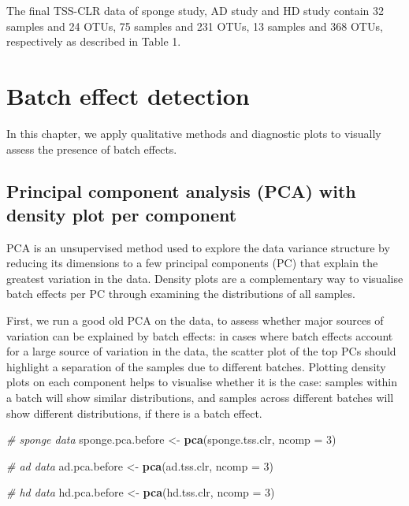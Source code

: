 \documentclass[]{book}
\newenvironment{Shaded}{\begin{snugshade}}{\end{snugshade}}
\newcommand{\KeywordTok}[1]{\textcolor[rgb]{0.13,0.29,0.53}{\textbf{#1}}}
\newcommand{\DataTypeTok}[1]{\textcolor[rgb]{0.13,0.29,0.53}{#1}}
\newcommand{\DecValTok}[1]{\textcolor[rgb]{0.00,0.00,0.81}{#1}}
\newcommand{\StringTok}[1]{\textcolor[rgb]{0.31,0.60,0.02}{#1}}
\newcommand{\CommentTok}[1]{\textcolor[rgb]{0.56,0.35,0.01}{\textit{#1}}}
\newcommand{\NormalTok}[1]{#1}
\begin{document}
The final TSS-CLR data of sponge study, AD study and HD study contain 32
samples and 24 OTUs, 75 samples and 231 OTUs, 13 samples and 368 OTUs,
respectively as described in Table 1.

\chapter{Batch effect detection}\label{detect}

In this chapter, we apply qualitative methods and diagnostic plots to
visually assess the presence of batch effects.

\section{Principal component analysis (PCA) with density plot per
component}\label{principal-component-analysis-pca-with-density-plot-per-component}

PCA is an unsupervised method used to explore the data variance
structure by reducing its dimensions to a few principal components (PC)
that explain the greatest variation in the data. Density plots are a
complementary way to visualise batch effects per PC through examining
the distributions of all samples.

First, we run a good old PCA on the data, to assess whether major
sources of variation can be explained by batch effects: in cases where
batch effects account for a large source of variation in the data, the
scatter plot of the top PCs should highlight a separation of the samples
due to different batches. Plotting density plots on each component helps
to visualise whether it is the case: samples within a batch will show
similar distributions, and samples across different batches will show
different distributions, if there is a batch effect.

\begin{Shaded}
\begin{Highlighting}[]
\CommentTok{# sponge data}
\NormalTok{sponge.pca.before <-}\StringTok{ }\KeywordTok{pca}\NormalTok{(sponge.tss.clr, }\DataTypeTok{ncomp =} \DecValTok{3}\NormalTok{)}

\CommentTok{# ad data}
\NormalTok{ad.pca.before <-}\StringTok{ }\KeywordTok{pca}\NormalTok{(ad.tss.clr, }\DataTypeTok{ncomp =} \DecValTok{3}\NormalTok{)}

\CommentTok{# hd data}
\NormalTok{hd.pca.before <-}\StringTok{ }\KeywordTok{pca}\NormalTok{(hd.tss.clr, }\DataTypeTok{ncomp =} \DecValTok{3}\NormalTok{)}
\end{Highlighting}
\end{Shaded}
\end{document}

